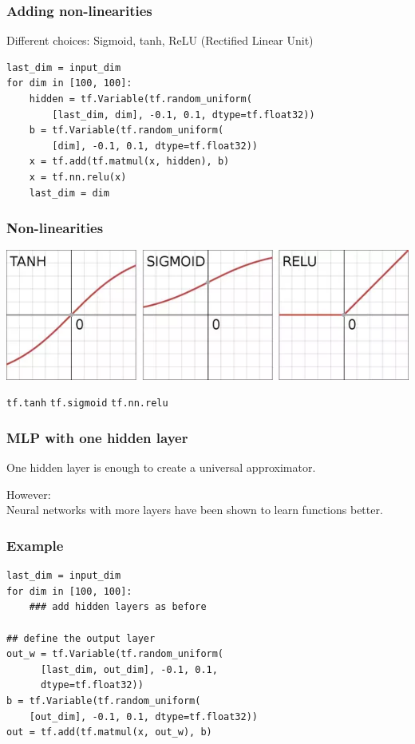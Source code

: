 \documentclass{beamer}
\begin{document}
\begin{frame}[fragile]
  \frametitle{Adding non-linearities}
  Different choices: Sigmoid, tanh, ReLU (Rectified Linear Unit)
  
  \begin{footnotesize}
\begin{lstlisting}
last_dim = input_dim
for dim in [100, 100]:
    hidden = tf.Variable(tf.random_uniform(
        [last_dim, dim], -0.1, 0.1, dtype=tf.float32))
    b = tf.Variable(tf.random_uniform(
        [dim], -0.1, 0.1, dtype=tf.float32))
    x = tf.add(tf.matmul(x, hidden), b)
    x = tf.nn.relu(x)
    last_dim = dim

\end{lstlisting}
  \end{footnotesize}
\end{frame}

\begin{frame}
  \frametitle{Non-linearities}
 \includegraphics[width=\textwidth]{nonlinear.png} 

 \lstinline{tf.tanh} \hfill \lstinline{tf.sigmoid} \hfill \lstinline{tf.nn.relu}
\end{frame}

\begin{frame}
  \frametitle{MLP with one hidden layer}

  One hidden layer is enough to create a universal approximator.\\\pause

  However:\\
  Neural networks with more layers have been shown to learn functions better.
  
\end{frame}


\begin{frame}[fragile]
  \frametitle{Example}
  
  \begin{footnotesize}
\begin{lstlisting}
last_dim = input_dim
for dim in [100, 100]:
    ### add hidden layers as before

## define the output layer
out_w = tf.Variable(tf.random_uniform(
      [last_dim, out_dim], -0.1, 0.1,
      dtype=tf.float32))
b = tf.Variable(tf.random_uniform(
    [out_dim], -0.1, 0.1, dtype=tf.float32))
out = tf.add(tf.matmul(x, out_w), b)
\end{lstlisting}
  \end{footnotesize}
\end{frame}
\end{document}
